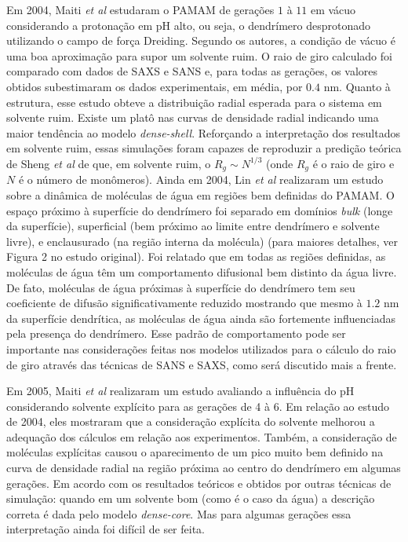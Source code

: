 Em 2004, Maiti \textit{et al}\cite{Maiti2004} estudaram o PAMAM de gerações $1$ à $11$ em vácuo considerando a protonação em pH alto, ou seja, o dendrímero desprotonado utilizando o campo de força Dreiding\cite{Mayo1990}.
Segundo os autores, a condição de vácuo é uma boa aproximação para supor um solvente ruim.
O raio de giro calculado foi comparado com dados de SAXS e SANS e, para todas as gerações, os valores obtidos subestimaram os dados experimentais, em média, por $0.4$ nm.
Quanto à estrutura, esse estudo obteve a distribuição radial esperada para o sistema em solvente ruim.
Existe um platô nas curvas de densidade radial indicando uma maior tendência ao modelo \textit{dense-shell}.
Reforçando a interpretação dos resultados em solvente ruim, essas simulações foram capazes de reproduzir a predição teórica de Sheng \textit{et al}\cite{Sheng2002} de que, em solvente ruim, o $R_g \sim N^{1/3}$ (onde $R_g$ é o raio de giro e $N$ é o número de monômeros).
Ainda em 2004, Lin \textit{et al}\cite{Lin2005} realizaram um estudo sobre a dinâmica de moléculas de água em regiões bem definidas do PAMAM.
O espaço próximo à superfície do dendrímero foi separado em domínios \textit{bulk} (longe da superfície), superficial (bem próximo ao limite entre dendrímero e solvente livre), e enclausurado (na região interna da molécula) (para maiores detalhes, ver Figura 2 no estudo original).
Foi relatado que em todas as regiões definidas, as moléculas de água têm um comportamento difusional bem distinto da água livre.
De fato, moléculas de água próximas à superfície do dendrímero tem seu coeficiente de difusão significativamente reduzido mostrando que mesmo à $1.2$ nm da superfície dendrítica, as moléculas de água ainda são fortemente influenciadas pela presença do dendrímero.
Esse padrão de comportamento pode ser importante nas considerações feitas nos modelos utilizados para o cálculo do raio de giro através das técnicas de SANS e SAXS, como será discutido mais a frente.

Em 2005, Maiti \textit{et al}\cite{Maiti2005} realizaram um estudo avaliando a influência do pH considerando solvente explícito para as gerações de 4 à 6. 
Em relação ao estudo de 2004, eles mostraram que a consideração explícita do solvente melhorou a adequação dos cálculos em relação aos experimentos.
Também, a consideração de moléculas explícitas causou o aparecimento de um pico muito bem definido na curva de densidade radial na região próxima ao centro do dendrímero em algumas gerações.
Em acordo com os resultados teóricos e obtidos por outras técnicas de simulação: quando em um solvente bom (como é o caso da água) a descrição correta é dada pelo modelo \textit{dense-core}.
Mas para algumas gerações essa interpretação ainda foi difícil de ser feita.

